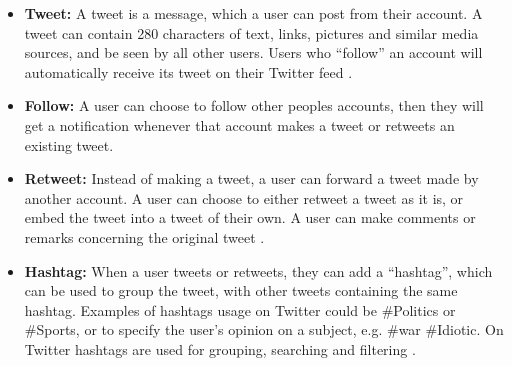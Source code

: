 \begin{itemize}
  \item \textbf{Tweet:} A tweet is a message, which a user can post from their
  account. A tweet can contain 280 characters \citep{Tweet280} of text, links,
  pictures and similar media sources, and be seen by all other users. Users who
  ``follow'' an account will automatically receive its tweet on their Twitter
  feed \citep{StartingTwitter2}.
  \item \textbf{Follow:} A user can choose to follow other peoples accounts,
  then they will get a notification whenever that account makes a tweet or
  retweets an existing tweet.
  \item \textbf{Retweet:} Instead of making a tweet, a user can forward a tweet
  made by another account. A user can choose to either retweet a tweet as it is,
  or embed the tweet into a tweet of their own. A user can make comments or
  remarks concerning the original tweet .
  \item \textbf{Hashtag:} When a user tweets or retweets, they can add a
  ``hashtag'', which can be used to group the tweet, with other tweets
  containing the same hashtag. Examples of hashtags usage on Twitter could be
  \#Politics or \#Sports, or to specify the user's opinion on a subject, e.g.
  \#war \#Idiotic. On Twitter hashtags are used for grouping, searching and
  filtering .
\end{itemize}

